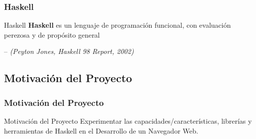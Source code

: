 \documentclass[12pt]{beamer}
\begin{document}
\begin{frame}
\frametitle{Haskell}
\begin{center}
\end{center}

\begin{block}{Haskell}
\textbf{Haskell} es un lenguaje de programación funcional, con evaluación perezosa y de 
propósito general 
\begin{flushright}
\--- \textit{(Peyton Jones, Haskell 98 Report, 2002)}
\end{flushright}
\end{block}
\end{frame}

\subsection{Motivación del Proyecto}
\begin{frame}
\frametitle{Motivación del Proyecto}

\begin{block}{Motivación del Proyecto}
Experimentar las capacidades/características, librerías y herramientas
de Haskell en el Desarrollo de un Navegador Web.
\end{block}

\end{frame}
\end{document}
